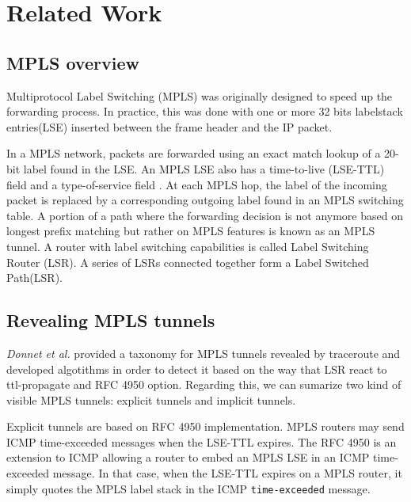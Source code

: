 \section{Related Work}\label{Related}

\subsection{MPLS overview}\label{Related.mpls}
Multiprotocol Label Switching (MPLS) \cite{REF} was originally designed
to speed up the forwarding process. In practice, this was done with one or more
32 bits labelstack entries(LSE) inserted between the frame header  and the IP
packet.

In a MPLS network, packets are forwarded using an exact match lookup of a 20-bit
label found in the LSE. An MPLS LSE also has a time-to-live (LSE-TTL) field and
a type-of-service field \cite{rfc1771}. At each MPLS hop, the label of the
incoming packet is replaced by a corresponding outgoing label found in an MPLS
switching table. A portion of a path where the forwarding decision is not
anymore based on longest prefix matching but rather on MPLS features is known as
an MPLS tunnel. A router with label switching capabilities is called Label
Switching Router (LSR). A series of LSRs connected together form a Label Switched Path(LSR).



\subsection{Revealing MPLS tunnels}

\textit{Donnet et al.} provided a taxonomy for MPLS tunnels revealed by
traceroute and developed algotithms in order to detect it based on the way that
LSR react to ttl-propagate  and RFC 4950 option. Regarding this, we can sumarize
two kind of visible MPLS tunnels: explicit tunnels and implicit tunnels.

Explicit tunnels are based on RFC 4950 implementation. MPLS routers may send
ICMP time-exceeded messages when the LSE-TTL expires. The RFC 4950 is an
extension to ICMP allowing a router to embed an MPLS LSE in an ICMP
time-exceeded message. In that case, when the LSE-TTL expires on a MPLS router,
it simply quotes the MPLS label stack in the ICMP \texttt{time-exceeded}
message.

